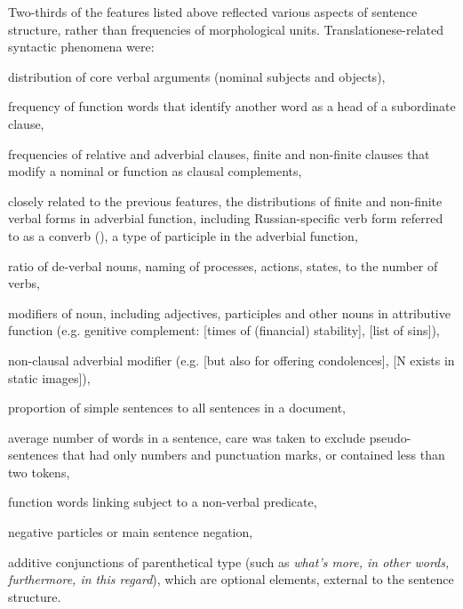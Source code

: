 Two-thirds of the features listed above reflected various aspects of sentence structure, rather than frequencies of morphological units. Translationese-related syntactic phenomena were: 
\begin{description}\compresslist{}
	\item[nsubj, obj:] distribution of core verbal arguments (nominal subjects and objects),
	\item[mark:] frequency of function words that identify another word as a head of a subordinate clause,
	\item[acl:relcl, advcl, acl, ccomp:] frequencies of relative and adverbial clauses, finite and non-finite clauses that modify a nominal or function as clausal complements,  %
	\item[finites, pverbals:] closely related to the previous features, the distributions of finite and non-finite verbal forms in adverbial function, including Russian-specific verb form referred to as a converb (), a type of participle in the adverbial function,
	\item[deverbals:] ratio of de-verbal nouns, naming of processes, actions, states, to the number of verbs,
	\item[amod, attrib, nmod:] modifiers of noun, including adjectives, participles and other nouns in attributive function (e.g. genitive complement:  [times of (financial) stability],  [list of sins]),
	\item[advmod:] non-clausal adverbial modifier (e.g.  [but also for offering condolences],  [N exists in static images]),
	\item[simple:] proportion of simple sentences to all sentences in a document, 
	\item[sentlength:] average number of words in a sentence, care was taken to exclude pseudo-sentences that had only numbers and punctuation marks, or contained less than two tokens,
	\item[copula:] function words linking subject to a non-verbal predicate, 
	\item[neg:] negative particles or main sentence negation,
	\item[addit:] additive conjunctions of parenthetical type (such as \textit{what's more, in other words, furthermore, in this regard}), which are optional elements, external to the sentence structure.
\end{description}
